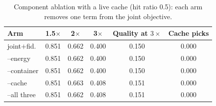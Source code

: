 \begin{table}
\centering
\footnotesize
\caption{Component ablation with a live cache (hit ratio 0.5): each arm removes one term from the joint objective.}
\label{tab:p2-ablation2}
\begin{tabular}{lccccc}
\toprule
Arm & 1.5$\times$ & 2$\times$ & 3$\times$ & Quality at $3\times$ & Cache picks \\
\midrule
joint$+$fid. & 0.851 & 0.662 & 0.400 & 0.150 & 0.000 \\
--energy & 0.851 & 0.662 & 0.400 & 0.150 & 0.000 \\
--container & 0.851 & 0.662 & 0.400 & 0.150 & 0.000 \\
--cache & 0.851 & 0.663 & 0.408 & 0.151 & 0.000 \\
--all three & 0.851 & 0.662 & 0.408 & 0.151 & 0.000 \\
\bottomrule
\end{tabular}
\par\vspace{2pt}{\footnotesize\raggedright No arm differs from the full mechanism by more than a point, so the cache, energy and container terms are inert in this workload. The cache-arm column records how often the cache term changed the pick: zero.\par}
\end{table}
